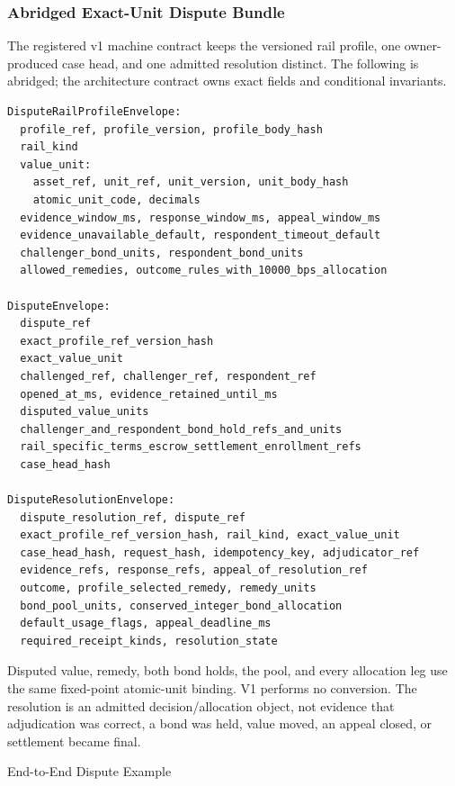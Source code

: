 \documentclass[
  11pt,
]{article}
\begin{document}
\hypertarget{canonical-dispute-schema-1}{%
\subsubsection{Abridged Exact-Unit Dispute
Bundle}\label{canonical-dispute-schema-1}}

The registered v1 machine contract keeps the versioned rail profile, one
owner-produced case head, and one admitted resolution distinct. The following
is abridged; the architecture contract owns exact fields and conditional
invariants.

\begin{lstlisting}[language={},basicstyle=\ttfamily\scriptsize]
DisputeRailProfileEnvelope:
  profile_ref, profile_version, profile_body_hash
  rail_kind
  value_unit:
    asset_ref, unit_ref, unit_version, unit_body_hash
    atomic_unit_code, decimals
  evidence_window_ms, response_window_ms, appeal_window_ms
  evidence_unavailable_default, respondent_timeout_default
  challenger_bond_units, respondent_bond_units
  allowed_remedies, outcome_rules_with_10000_bps_allocation

DisputeEnvelope:
  dispute_ref
  exact_profile_ref_version_hash
  exact_value_unit
  challenged_ref, challenger_ref, respondent_ref
  opened_at_ms, evidence_retained_until_ms
  disputed_value_units
  challenger_and_respondent_bond_hold_refs_and_units
  rail_specific_terms_escrow_settlement_enrollment_refs
  case_head_hash

DisputeResolutionEnvelope:
  dispute_resolution_ref, dispute_ref
  exact_profile_ref_version_hash, rail_kind, exact_value_unit
  case_head_hash, request_hash, idempotency_key, adjudicator_ref
  evidence_refs, response_refs, appeal_of_resolution_ref
  outcome, profile_selected_remedy, remedy_units
  bond_pool_units, conserved_integer_bond_allocation
  default_usage_flags, appeal_deadline_ms
  required_receipt_kinds, resolution_state
\end{lstlisting}

Disputed value, remedy, both bond holds, the pool, and every allocation leg use
the same fixed-point atomic-unit binding. V1 performs no conversion. The
resolution is an admitted decision/allocation object, not evidence that
adjudication was correct, a bond was held, value moved, an appeal closed, or
settlement became final.


End-to-End Dispute Example
\end{document}

